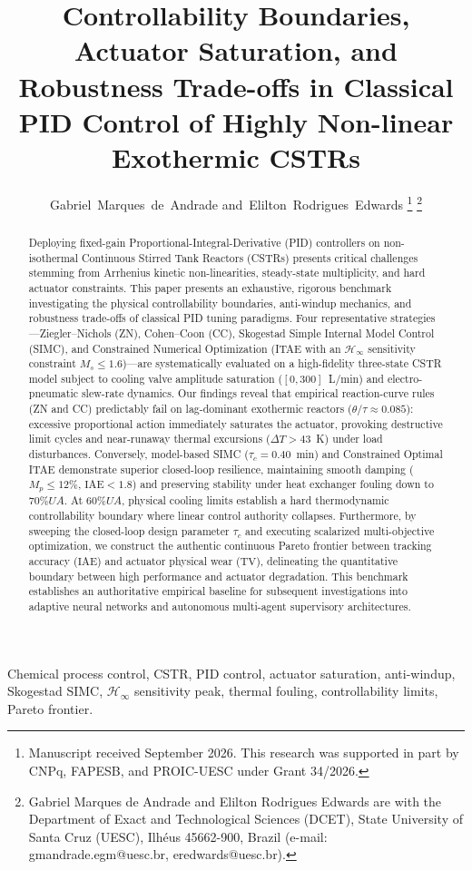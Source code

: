\documentclass[journal]{IEEEtran}
\title{Controllability Boundaries, Actuator Saturation, and Robustness Trade-offs in Classical PID Control of Highly Non-linear Exothermic CSTRs}
\author{Gabriel~Marques~de~Andrade
        and~Elilton~Rodrigues~Edwards%
\thanks{Manuscript received September 2026. This research was supported in part by CNPq, FAPESB, and PROIC-UESC under Grant 34/2026.}%
\thanks{Gabriel Marques de Andrade and Elilton Rodrigues Edwards are with the Department of Exact and Technological Sciences (DCET), State University of Santa Cruz (UESC), Ilhéus 45662-900, Brazil (e-mail: gmandrade.egm@uesc.br, eredwards@uesc.br).}%
}
\begin{document}
\maketitle

\begin{abstract}
Deploying fixed-gain Proportional-Integral-Derivative (PID) controllers on non-isothermal Continuous Stirred Tank Reactors (CSTRs) presents critical challenges stemming from Arrhenius kinetic non-linearities, steady-state multiplicity, and hard actuator constraints. This paper presents an exhaustive, rigorous benchmark investigating the physical controllability boundaries, anti-windup mechanics, and robustness trade-offs of classical PID tuning paradigms. Four representative strategies—Ziegler--Nichols (ZN), Cohen--Coon (CC), Skogestad Simple Internal Model Control (SIMC), and Constrained Numerical Optimization (ITAE with an $\mathcal{H}_\infty$ sensitivity constraint $M_s \le 1.6$)—are systematically evaluated on a high-fidelity three-state CSTR model subject to cooling valve amplitude saturation ($[0, 300]$~L/min) and electro-pneumatic slew-rate dynamics. Our findings reveal that empirical reaction-curve rules (ZN and CC) predictably fail on lag-dominant exothermic reactors ($\theta/\tau \approx 0.085$): excessive proportional action immediately saturates the actuator, provoking destructive limit cycles and near-runaway thermal excursions ($\Delta T > 43$~K) under load disturbances. Conversely, model-based SIMC ($\tau_c = 0.40$~min) and Constrained Optimal ITAE demonstrate superior closed-loop resilience, maintaining smooth damping ($M_p \le 12\%$, $\text{IAE} < 1.8$) and preserving stability under heat exchanger fouling down to $70\% UA$. At $60\% UA$, physical cooling limits establish a hard thermodynamic controllability boundary where linear control authority collapses. Furthermore, by sweeping the closed-loop design parameter $\tau_c$ and executing scalarized multi-objective optimization, we construct the authentic continuous Pareto frontier between tracking accuracy ($\text{IAE}$) and actuator physical wear ($\text{TV}$), delineating the quantitative boundary between high performance and actuator degradation. This benchmark establishes an authoritative empirical baseline for subsequent investigations into adaptive neural networks and autonomous multi-agent supervisory architectures.
\end{abstract}

\begin{IEEEkeywords}
Chemical process control, CSTR, PID control, actuator saturation, anti-windup, Skogestad SIMC, $\mathcal{H}_\infty$ sensitivity peak, thermal fouling, controllability limits, Pareto frontier.
\end{IEEEkeywords}
\end{document}

